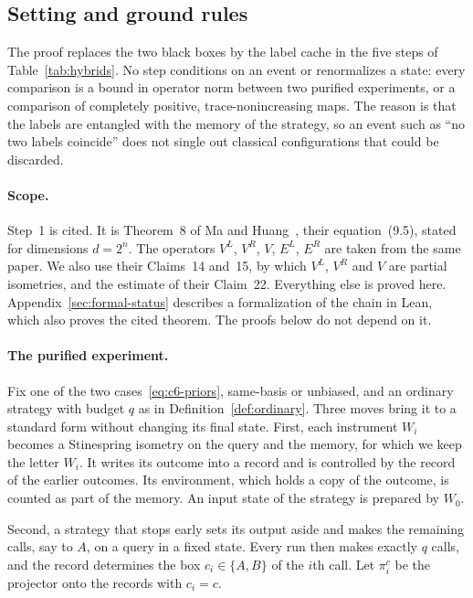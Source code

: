 \documentclass[11pt,letterpaper]{article}
\theoremstyle{definition}\newtheorem{definition}[theorem]{Definition}
\begin{document}
\subsection*{Setting and ground rules}\label{appA:setting}

The proof replaces the two black boxes by the label cache in the five
steps of Table~\ref{tab:hybrids}. No step conditions on an event or
renormalizes a state: every comparison is a bound in operator norm
between two purified experiments, or a comparison of completely
positive, trace-nonincreasing maps. The reason is that the labels are
entangled with the memory of the strategy, so an event such as ``no two
labels coincide'' does not single out classical configurations that
could be discarded.

\paragraph{Scope.}
Step~1 is cited. It is Theorem~8 of Ma and
Huang~\cite{mahuang2025}, their equation~(9.5), stated for dimensions
$d=2^n$. The operators $V^L$, $V^R$, $V$, $E^L$, $E^R$
are taken from the same paper. We also use their Claims~14 and~15, by
which $V^L$, $V^R$ and $V$ are partial isometries, and the estimate of
their Claim~22. Everything else is proved here.
Appendix~\ref{sec:formal-status} describes a formalization of the chain
in Lean, which also proves the cited theorem. The proofs below do not
depend on it.

\paragraph{The purified experiment.}
Fix one of the two cases~\eqref{eq:c6-priors}, same-basis or unbiased,
and an ordinary strategy with budget $q$ as in
Definition~\ref{def:ordinary}. Three moves bring it
to a standard form without changing its final state. First, each
instrument $W_i$ becomes a Stinespring isometry on the query and the
memory, for which we keep the letter $W_i$. It writes its outcome into
a record and is controlled by the record of the earlier outcomes. Its
environment, which holds a copy of the outcome, is counted as part of
the memory. An input state of the strategy is prepared by $W_0$.

Second, a strategy that stops early sets its output aside
and makes the remaining calls, say to $A$, on a query in a fixed
state. Every run
then makes exactly $q$ calls, and the record determines the box
$c_i\in\{A,B\}$ of the $i$th call. Let $\pi^c_i$ be the projector onto
the records with $c_i=c$.
\end{document}
